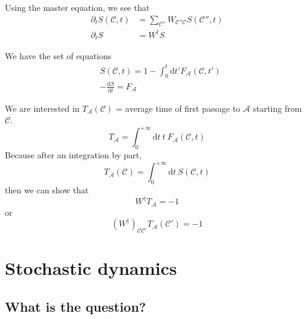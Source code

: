 \documentclass[a4paper]{book}
\theoremstyle{definition}
\theoremstyle{remark}
\begin{document}
Using the master equation, we see that 
\begin{equation}
    \begin{aligned}
        \partial_t S(\mathscr{C}, t) &= \sum_{\mathscr{C}''} W_{\mathscr{C}''\mathscr{C}} S(\mathscr{C}'', t) \\
        \partial_t S &= W^\dagger S
    \end{aligned}
\end{equation}

We have the set of equations 
\begin{equation}
    \begin{aligned}
        &S(\mathscr{C}, t) = 1 - \int_{0}^{t} \text{d}t' F_\mathcal{A}(\mathscr{C}, t') \\ 
        & -\frac{\text{d}S}{\text{d}t} = F_\mathcal{A}
    \end{aligned}
\end{equation}

We are interested in $T_\mathcal{A}(\mathscr{C})$ = average time of first passage to $\mathcal{A}$ starting from $\mathscr{C}$. 
\begin{equation}
    T_\mathcal{A} = \int_{0}^{+\infty} \text{d}t ~ t~ F_\mathcal{A}(\mathscr{C}, t)
\end{equation}
Because after an integration by part, 
\begin{equation}
    T_\mathcal{A}(\mathscr{C}) = \int_{0}^{+\infty} \text{d}t ~ S(\mathscr{C}, t)
\end{equation}
then we can show that 
\begin{equation}
    W^\dagger T_\mathcal{A} = -1
\end{equation}
or 
\begin{equation}
    (W^\dagger)_{\mathscr{C}\mathscr{C}'}T_\mathcal{A}(\mathscr{C}') = -1
\end{equation}



\chapter{Stochastic dynamics}

\section{What is the question?}
\end{document}
